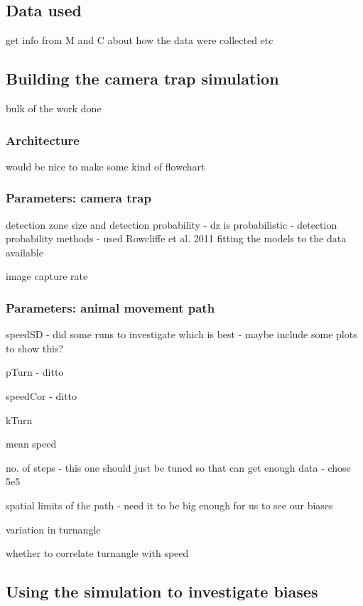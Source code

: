 \documentclass[11pt]{article}
\begin{document}
	\subsection{Data used}
	
	get info from M and C about how the data were collected etc
	
	
	\subsection{Building the camera trap simulation}
	
	bulk of the work done
	
	\subsubsection{Architecture}
	
	would be nice to make some kind of flowchart
	
	
	
	
	
	\subsubsection{Parameters: camera trap}
	
	detection zone size and detection probability
	- dz is probabilistic
	- detection probability methods - used Rowcliffe et al. 2011 fitting the models to the data available
	
	
	image capture rate
	
	
	\subsubsection{Parameters: animal movement path}
	
	speedSD
	- did some runs to investigate which is best
	- maybe include some plots to show this?
	
	pTurn
	- ditto
	
	speedCor
	- ditto
	
	kTurn
	
	mean speed
	
	no. of steps
	- this one should just be tuned so that can get enough data 
	- chose 5e5
	
	spatial limits of the path
	- need it to be big enough for us to see our biases
	
	variation in turnangle
	
	whether to correlate turnangle with speed
	
	\subsection{Using the simulation to investigate biases}
	
\end{document}
